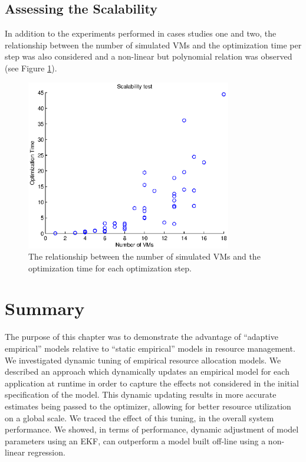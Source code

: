 \subsection{Assessing the Scalability}
 In addition to the experiments performed in cases studies one and two, the relationship between the number of simulated VMs and the optimization time per step was also considered and a non-linear but polynomial relation was observed (see Figure \ref{fig:scalability}). 
\begin{figure} 
	\centering
	  \includegraphics[width=0.8\textwidth]{image/centralized1/scalability}		
	\caption{The relationship between the number of simulated VMs and the optimization time for each optimization step.}%
	\label{fig:scalability} 
\end{figure}

\section{Summary}  
\label{sec:future-work}
The purpose of this chapter was to demonstrate the advantage of ``adaptive empirical'' models relative to ``static empirical'' models in resource management.  
We investigated dynamic tuning of empirical resource allocation models. 
We described an approach which dynamically updates an empirical model for each application at runtime in order to capture the effects not considered in the initial specification of the model. 
This dynamic updating results in more accurate estimates being passed to the optimizer, allowing for better resource utilization on a global scale.  
We traced the effect of this tuning, in the overall system performance. We showed, in terms of performance, dynamic adjustment of model parameters using an EKF, can outperform a model built off-line using a non-linear regression. 

